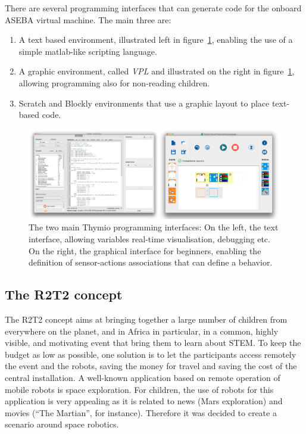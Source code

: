 \documentclass{intech-journal}
\begin{document}
There are several programming interfaces that can generate code for the onboard ASEBA virtual machine. 
The main three are:
\begin{enumerate}
\item A text based environment, illustrated left in figure~\ref{fig:programming}, enabling the use of a simple matlab-like scripting language.
\item A graphic environment, called \textit{VPL} and illustrated on the right in figure~\ref{fig:programming}, allowing programming also for non-reading children.
\item Scratch and Blockly environments that use a graphic layout to place text-based code.
\end{enumerate}

\begin{figure}[ht]
 \centering
    \includegraphics[width=0.9\columnwidth]{figures/studio-VPL.png}
  \caption{The two main Thymio programming interfaces: On the left, the text interface, allowing variables real-time visualisation, debugging etc. On the right, the graphical interface for beginners, enabling the definition of sensor-actions associations that can define a behavior.}
  \label{fig:programming} 
\end{figure}

\subsection{The R2T2 concept}

The R2T2 concept aims at bringing together a large number of children from everywhere on the planet, and in Africa in particular, in a common, highly visible, and motivating event that bring them to learn about STEM.
To keep the budget as low as possible, one solution is to let the participants access remotely the event and the robots, saving the money for travel and saving the cost of the central installation.
A well-known application based on remote operation of mobile robots is space exploration.
For children, the use of robots for this application is very appealing as it is related to news (Mars exploration) and movies (``The Martian'', for instance).
Therefore it was decided to create a scenario around space robotics.
\end{document}
